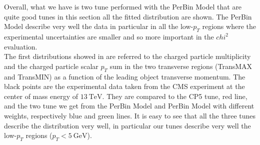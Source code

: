 Overall, what we have is two tune performed with the PerBin Model that are quite good tunes in this section all the fitted distribution are shown. The PerBin Model describe very well the data in particular in all the low-$p_T$ regions  where the experimental uncertainties are smaller and so more important in the $chi^2$ evaluation.
\\
The first distributions showed in  are referred to the charged particle multiplicity and the charged particle scalar $p_T$ sum in the two transverse regions (TransMAX and TransMIN) as a function of the leading object transverse momentum. The black points are the experimental data taken from the CMS experiment at the center of mass energy of $13\ \mathrm{TeV}$. They are compared to the CP5 tune, red line, and the two tune we get from the PerBin Model and PerBin Model with different weights, respectively blue and green lines. It is easy to see that all the three tunes describe the distribution very well, in particular our tunes describe very well the low-$p_T$ regions ($p_T<5 \ \mathrm{GeV}$).


